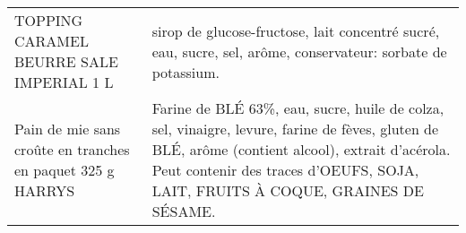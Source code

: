 \begin{longtable}{p{5cm}p{10cm}}
                                                                 TOPPING CARAMEL BEURRE SALE IMPERIAL 1 L &                                                                                                                                                                                                                                                                                                                                                                                                                                                                                                                                                                                                                                                                                                                                                                                                                                                                                                                             sirop de glucose-fructose, lait concentré sucré, eau, sucre, sel, arôme, conservateur: sorbate de potassium. \\
                                               Pain de mie sans croûte en tranches en paquet 325 g HARRYS &                                                                                                                                                                                                                                                                                                                                                                                                                                                                                                                                                                                                                                                                                                                                                                                                      Farine de BLÉ 63\%, eau, sucre, huile de colza, sel, vinaigre, levure, farine de fèves, gluten de BLÉ, arôme (contient alcool), extrait d'acérola. Peut contenir  des traces d'OEUFS, SOJA, LAIT, FRUITS À COQUE, GRAINES DE SÉSAME. \\

\end{longtable}
